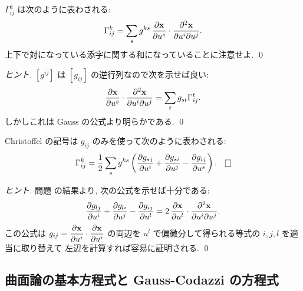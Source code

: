 \documentclass[12pt,twoside]{jarticle}
\begin{document}
\begin{question}
 \label{q:Ch-hosoku}
 $\Gamma^k_{ij}$ は次のように表わされる:
 \begin{equation*}
  \Gamma^k_{ij} 
   = \sum_s g^{ks}\,\dfrac{\partial{\mathbf x}}{\partial u^s}\cdot\dfrac{\partial^2{\mathbf x}}{\partial u^i\partial u^j}.
 \end{equation*}
 上下で対になっている添字に関する和になっていることに注意せよ. \qed
\end{question}

\begin{proof}[ヒント]
 $[g^{ij}]$ は $[g_{ij}]$ の逆行列なので次を示せば良い:
 \begin{equation*}
  \dfrac{\partial{\mathbf x}}{\partial u^s}\cdot\dfrac{\partial^2{\mathbf x}}{\partial u^i\partial u^j}
  = \sum_t g_{st} \Gamma^t_{ij}.
 \end{equation*}
 しかしこれは Gauss の公式より明らかである. \qed
\end{proof}

\begin{question}
 \label{q:Ch=ggg}
 Christoffel の記号は $g_{ij}$ のみを使って次のように表わされる:
 \begin{equation*}
  \Gamma^k_{ij}
   =
   \frac{1}{2}
   \sum_s g^{ks}
   \left(
      \dfrac{\d g_{sj}}{\d u^i} 
    + \dfrac{\d g_{si}}{\d u^j}
    - \dfrac{\d g_{ij}}{\d u^s}
   \right).
  \qed
 \end{equation*}
\end{question}

\begin{proof}[ヒント]
 問題  の結果より, 次の公式を示せば十分である:
 \begin{equation*}
    \dfrac{\partial g_{lj}}{\partial u^i} 
  + \dfrac{\partial g_{li}}{\partial u^j}
  - \dfrac{\partial g_{ij}}{\partial u^l}
  =
  2\,\dfrac{\partial{\mathbf x}}{\partial u^l}\cdot\dfrac{\partial^2{\mathbf x}}{\partial u^i\partial u^j}.
 \end{equation*}
 この公式は $g_{ij}=\dfrac{\partial{\mathbf x}}{\partial u^i}\cdot\dfrac{\partial{\mathbf x}}{\partial u^i}$ 
 の両辺を $u^l$ で偏微分して得られる等式の $i,j,l$ を適当に取り替えて
 左辺を計算すれば容易に証明される.
 \qed
\end{proof}


\subsection{曲面論の基本方程式と Gauss-Codazzi の方程式}
\end{document}
